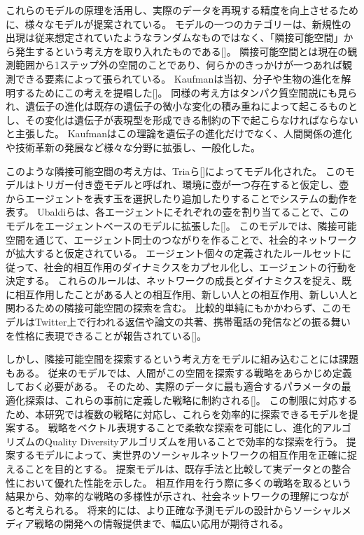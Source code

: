 \documentclass[uplatex,11pt,openany]{ujreport}
\begin{document}
    これらのモデルの原理を活用し、実際のデータを再現する精度を向上させるために、様々なモデルが提案されている。
    モデルの一つのカテゴリーは、新規性の出現は従来想定されていたようなランダムなものではなく、「隣接可能空間」から発生するという考え方を取り入れたものである[]。
    隣接可能空間とは現在の観測範囲から1ステップ外の空間のことであり、何らかのきっかけが一つあれば観測できる要素によって張られている。
    Kaufmanは当初、分子や生物の進化を解明するためにこの考えを提唱した[]。
    同様の考え方はタンパク質空間説にも見られ、遺伝子の進化は既存の遺伝子の微小な変化の積み重ねによって起こるものとし、その変化は遺伝子が表現型を形成できる制約の下で起こらなければならないと主張した。
    Kaufmanはこの理論を遺伝子の進化だけでなく、人間関係の進化や技術革新の発展など様々な分野に拡張し、一般化した。

    このような隣接可能空間の考え方は、Triaら[]によってモデル化された。
    このモデルはトリガー付き壺モデルと呼ばれ、環境に壺が一つ存在すると仮定し、壺からエージェントを表す玉を選択したり追加したりすることでシステムの動作を表す。
    Ubaldiらは、各エージェントにそれぞれの壺を割り当てることで、このモデルをエージェントベースのモデルに拡張した[]。
    このモデルでは、隣接可能空間を通じて、エージェント同士のつながりを作ることで、社会的ネットワークが拡大すると仮定されている。
    エージェント個々の定義されたルールセットに従って、社会的相互作用のダイナミクスをカプセル化し、エージェントの行動を決定する。
    これらのルールは、ネットワークの成長とダイナミクスを捉え、既に相互作用したことがある人との相互作用、新しい人との相互作用、新しい人と関わるための隣接可能空間の探索を含む。
    比較的単純にもかかわらず、このモデルはTwitter上で行われる返信や論文の共著、携帯電話の発信などの振る舞いを性格に表現できることが報告されている[]。

    しかし、隣接可能空間を探索するという考え方をモデルに組み込むことには課題もある。
    従来のモデルでは、人間がこの空間を探索する戦略をあらかじめ定義しておく必要がある。
    そのため、実際のデータに最も適合するパラメータの最適化探索は、これらの事前に定義した戦略に制約される[]。
    この制限に対応するため、本研究では複数の戦略に対応し、これらを効率的に探索できるモデルを提案する。
    戦略をベクトル表現することで柔軟な探索を可能にし、進化的アルゴリズムのQuality Diversityアルゴリズムを用いることで効率的な探索を行う。
    提案するモデルによって、実世界のソーシャルネットワークの相互作用を正確に捉えることを目的とする。
    提案モデルは、既存手法と比較して実データとの整合性において優れた性能を示した。
    相互作用を行う際に多くの戦略を取るという結果から、効率的な戦略の多様性が示され、社会ネットワークの理解につながると考えられる。
    将来的には、より正確な予測モデルの設計からソーシャルメディア戦略の開発への情報提供まで、幅広い応用が期待される。
\end{document}
